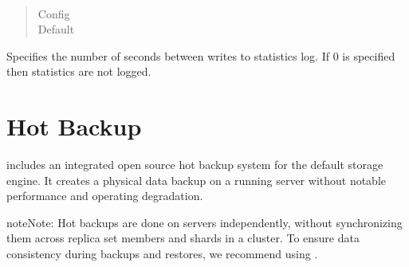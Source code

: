 \documentclass[letterpaper,10pt,english]{sphinxmanual}
\begin{document}
\begin{fulllineitems}
\label{\detokenize{inmemory:cmdoption-inMemoryStatisticsLogDelaySecs}}~\begin{quote}\begin{description}
\item[{Config}] \leavevmode
\sphinxAtStartPar
{}

\item[{Default}] \leavevmode
{}

\end{description}\end{quote}

\sphinxAtStartPar
Specifies the number of seconds between writes to statistics log.  If 0 is
specified then statistics are not logged.

\end{fulllineitems}



\chapter{Hot Backup}
\label{\detokenize{hot-backup:hot-backup}}\label{\detokenize{hot-backup:id1}}\label{\detokenize{hot-backup::doc}}
\sphinxAtStartPar
{} includes an integrated open source hot backup system for the default
 storage engine.  It creates a physical data backup on a running
server without notable performance and operating degradation.

\begin{sphinxadmonition}{note}{Note:}
\sphinxAtStartPar
Hot backups are done on  servers independently, without synchronizing them across replica set members and shards in a cluster. To ensure data consistency during backups and restores, we recommend using .
\end{sphinxadmonition}
\end{document}
